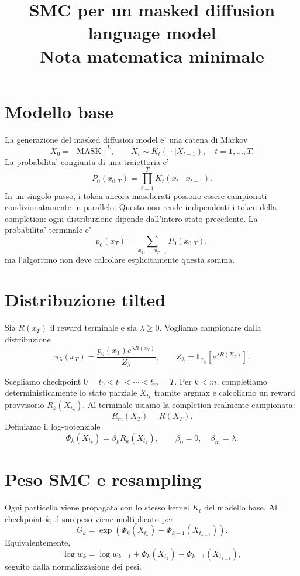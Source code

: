 \documentclass[11pt]{article}
\title{SMC per un masked diffusion language model\\
\large Nota matematica minimale}
\author{}
\date{}
\begin{document}
\maketitle

\section{Modello base}

La generazione del masked diffusion model e' una catena di Markov
\[
X_0=[\mathrm{MASK}]^L,\qquad X_t\sim K_t(\,\cdot\mid X_{t-1}),
\quad t=1,\ldots,T.
\]
La probabilita' congiunta di una traiettoria e'
\[
P_0(x_{0:T})
=\prod_{t=1}^{T}K_t(x_t\mid x_{t-1}).
\]
In un singolo passo, i token ancora mascherati possono essere campionati
condizionatamente in parallelo. Questo non rende indipendenti i token della
completion: ogni distribuzione dipende dall'intero stato precedente. La
probabilita' terminale e'
\[
p_0(x_T)=\sum_{x_1,\ldots,x_{T-1}}P_0(x_{0:T}),
\]
ma l'algoritmo non deve calcolare esplicitamente questa somma.

\section{Distribuzione tilted}

Sia $R(x_T)$ il reward terminale e sia $\lambda\geq 0$. Vogliamo campionare
dalla distribuzione
\[
\pi_\lambda(x_T)
=\frac{p_0(x_T)e^{\lambda R(x_T)}}{Z_\lambda},
\qquad
Z_\lambda=\mathbb E_{p_0}[e^{\lambda R(X_T)}].
\]

Scegliamo checkpoint $0=t_0<t_1<\cdots<t_m=T$. Per $k<m$, completiamo
deterministicamente lo stato parziale $X_{t_k}$ tramite argmax e calcoliamo
un reward provvisorio $R_k(X_{t_k})$. Al terminale usiamo la completion
realmente campionata:
\[
R_m(X_T)=R(X_T).
\]
Definiamo il log-potenziale
\[
\Phi_k(X_{t_k})=\beta_k R_k(X_{t_k}),
\qquad \beta_0=0,\quad \beta_m=\lambda.
\]

\section{Peso SMC e resampling}

Ogni particella viene propagata con lo stesso kernel $K_t$ del modello base.
Al checkpoint $k$, il suo peso viene moltiplicato per
\[
G_k
=\exp\!\left(
\Phi_k(X_{t_k})-\Phi_{k-1}(X_{t_{k-1}})
\right).
\]
Equivalentemente,
\[
\log w_k
=\log w_{k-1}
+\Phi_k(X_{t_k})-\Phi_{k-1}(X_{t_{k-1}}),
\]
seguito dalla normalizzazione dei pesi.
\end{document}
